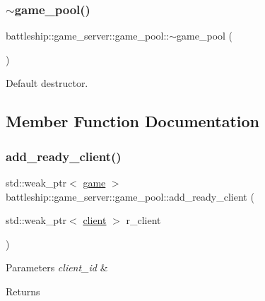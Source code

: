 \subsubsection{\texorpdfstring{$\sim$game\+\_\+pool()}{~game\_pool()}}
{\footnotesize\ttfamily battleship\+::game\+\_\+server\+::game\+\_\+pool\+::$\sim$game\+\_\+pool (\begin{DoxyParamCaption}{ }\end{DoxyParamCaption})\hspace{0.3cm}{\ttfamily [inline]}}

Default destructor. 

\subsection{Member Function Documentation}
\mbox{\label{classbattleship_1_1game__server_1_1game__pool_a6d460991bba52fc0d04bd1ee65989ba2}} 
\subsubsection{\texorpdfstring{add\+\_\+ready\+\_\+client()}{add\_ready\_client()}}
{\footnotesize\ttfamily std\+::weak\+\_\+ptr$<$ \hyperlink{classbattleship_1_1game__server_1_1game}{game} $>$ battleship\+::game\+\_\+server\+::game\+\_\+pool\+::add\+\_\+ready\+\_\+client (\begin{DoxyParamCaption}\item[{std\+::weak\+\_\+ptr$<$ \hyperlink{classbattleship_1_1game__server_1_1client}{client} $>$}]{r\+\_\+client }\end{DoxyParamCaption})}


\begin{DoxyParams}{Parameters}
{\em client\+\_\+id} & \\
\hline
\end{DoxyParams}
\begin{DoxyReturn}{Returns}

\end{DoxyReturn}
\mbox{\label{classbattleship_1_1game__server_1_1game__pool_ad6c1392c3842f1a37c762d1c27eba7d2}} 
